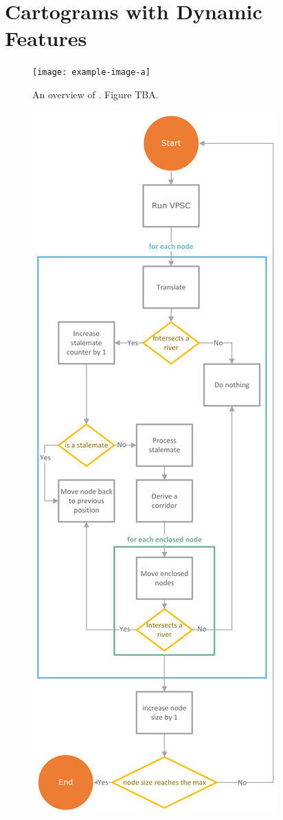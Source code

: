 \section{Cartograms with Dynamic Features}

{
\begin{figure}[b!]
    \centering
    \texttt{[image: example-image-a]}
    \caption{An overview of \software. Figure TBA.}
    \label{fig:overview}
\end{figure}
}

{
\begin{figure}[b!]
    \centering
    \includegraphics[width=\columnwidth]{figure/flowchart.png}

\end{figure}}

